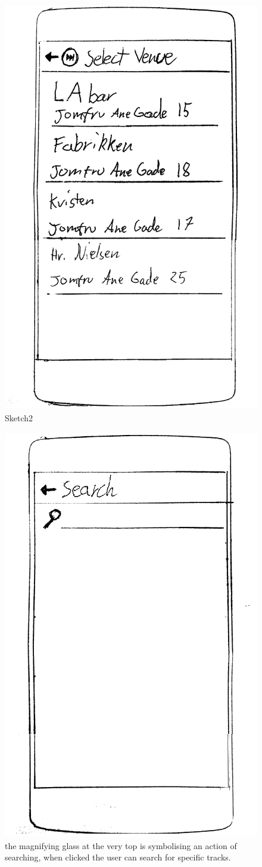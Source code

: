 \begin{figure}
  \centering
  \includegraphics[width=0.25\linewidth]{Images/sketch2.png}
  \caption{Sketch2}
  \label{fig:VenueSketch}
\end{figure}


\begin{figure}
  \centering
  \includegraphics[width=0.25\linewidth]{Images/sketch4.png}
  \caption{the magnifying glass at the very top is symbolising an action of searching, when clicked the user can search for specific tracks.}
  \label{fig:BrowseSketch}
\end{figure}
